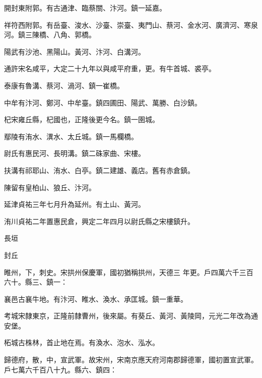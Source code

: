 \begin{pinyinscope}
 開封東附郭。有古通津、臨蔡關、汴河。鎮一延嘉。



 祥符西附郭。有岳臺、浚水、沙臺、崇臺、夷門山、蔡河、金水河、廣濟河、寒泉河。鎮三陳橋、八角、郭橋。



 陽武有沙池、黑陽山。黃河、汴河、白溝河。



 通許宋名咸平，大定二十九年以與咸平府重，更。有牛首城、裘亭。



 泰康有魯溝、蔡河、渦河、鎮一崔橋。



 中牟有汴河、鄭河、中牟臺。鎮四圃田、陽武、萬勝、白沙鎮。



 杞宋雍丘縣，杞國也，正隆後更今名。鎮一圉城。



 鄢陵有洧水、潩水、太丘城。鎮一馬欄橋。



 尉氏有惠民河、長明溝。鎮二硃家曲、宋樓。



 扶溝有祁耶山、洧水、白亭。鎮二建雄、義店。舊有赤倉鎮。



 陳留有皇柏山、狼丘、汴河。



 延津貞祐三年七月升為延州。有土山、黃河。



 洧川貞祐二年置惠民倉，興定二年四月以尉氏縣之宋樓鎮升。



 長垣



 封丘



 睢州，下，刺史。宋拱州保慶軍，國初猶稱拱州，天德三
 年更。戶四萬六千三百六十。縣三、鎮一：



 襄邑古襄牛地。有汴河、睢水、渙水、承匡城。鎮一重華。



 考城宋隸東京，正隆前隸曹州，後來屬。有葵丘、黃河、黃陵岡，元光二年改為通安堡。



 柘城古株林，首止地在焉。有渙水、泡水、泓水。



 歸德府，散，中，宣武軍。故宋州，宋南京應天府河南郡歸德軍，國初置宣武軍。戶七萬六千百八十九。縣六、鎮四：




\end{pinyinscope}
